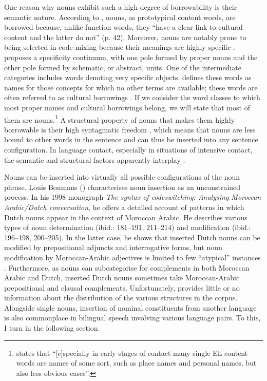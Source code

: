 One reason why nouns exhibit such a high degree of borrowability is their semantic nature. According to \citet{van-hout-muysken}, nouns, as prototypical content words, are borrowed because, unlike function words, they ``have a clear link to cultural content and the latter do not'' (p. 42). Moreover, nouns are notably prone to being selected in code-mixing because their meanings are highly specific \citep{backus-two-1996,backus-2001,field-2002}. \citet[115--131]{backus-two-1996} proposes a specificity continuum, with one pole formed by proper nouns and the other pole formed by schematic, or abstract, units. One of the intermediate categories includes words denoting very specific objects. \citet[116]{backus-two-1996} defines these words as names for those concepts for which no other terms are available; these words are often referred to as cultural borrowings \citep[cf.][165]{myers-scotton-duelling-1993}. If we consider the word classes to which most proper names and cultural borrowings belong, we will state that most of them are nouns.\footnote{\citet[][116]{backus-two-1996} states that ``[e]specially in early stages of contact many single EL content words are names of some sort, such as place names and personal names, but also less obvious cases''.} A structural property of nouns that makes them highly borrowable is their high syntagmatic freedom \citep{backus-13}, which means that nouns are less bound to other words in the sentence and can thus be inserted into any sentence configuration. In language contact, especially in situations of intensive contact, the semantic and structural factors apparently interplay \citep[cf.][]{van-hout-muysken}.

Nouns can be inserted into virtually all possible configurations of the noun phrase. Louis Boumans (\citeyear[221]{boumans-syntax-1998}) characterises noun insertion as an unconstrained process. In his 1998 monograph  \textit{The syntax of codeswitching: Analysing
Moroccan Arabic/Dutch conversation}, he offers a detailed account of patterns in which Dutch nouns appear in the context of Moroccan Arabic. He describes various types of noun determination (ibid.: 181--191, 211--214) and modification (ibid.: 196--198, 200--205). In the latter case, he shows that inserted Dutch nouns can be modified by prepositional adjuncts and interrogative forms, but noun modification by Moroccan-Arabic adjectives is limited to few ``atypical'' instances \citep[200--201]{boumans-syntax-1998}. Furthermore, as nouns can subcategorise for complements in both Moroccan Arabic and Dutch, inserted Dutch nouns sometimes take Moroccan-Arabic prepositional and clausal complements. Unfortunately, \citet{boumans-syntax-1998} provides little or no information about the distribution of the various structures in the corpus.
Alongside single nouns, insertion of nominal constituents from another language is also commonplace in bilingual speech involving various language pairs. To this, I turn in the following section.

